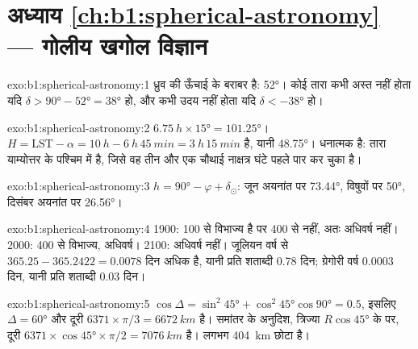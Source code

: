 \section*{अध्याय \ref{ch:b1:spherical-astronomy} --- गोलीय खगोल विज्ञान}

\begin{solution}{exo:b1:spherical-astronomy:1}
ध्रुव की ऊँचाई  के बराबर है: \ang{52}। कोई तारा कभी अस्त नहीं होता यदि
$\delta > \ang{90} - \ang{52} = \ang{38}$ हो, और कभी उदय नहीं होता यदि
$\delta < \ang{-38}$ हो।
\end{solution}

\begin{solution}{exo:b1:spherical-astronomy:2}
$\qty{6.75}{h}\times\ang{15} = \ang{101.25}$। $H = \mathrm{LST} - \alpha =
\qty{10}{h} - \qty{6}{h}\,\qty{45}{min} = \qty{3}{h}\,\qty{15}{min}$ है, यानी
\ang{48.75}।  धनात्मक है: तारा याम्योत्तर के पश्चिम में है, जिसे वह तीन और एक चौथाई
नाक्षत्र घंटे पहले पार कर चुका है।
\end{solution}

\begin{solution}{exo:b1:spherical-astronomy:3}
$h = \ang{90} - \varphi + \delta_\odot$: जून अयनांत पर \ang{73.44}, विषुवों पर \ang{50},
दिसंबर अयनांत पर \ang{26.56}।
\end{solution}

\begin{solution}{exo:b1:spherical-astronomy:4}
1900: 100 से विभाज्य है पर 400 से नहीं, अतः अधिवर्ष नहीं। 2000: 400 से विभाज्य, अधिवर्ष।
2100: अधिवर्ष नहीं। जूलियन वर्ष  से $365.25 - 365.2422 = 0.0078$ दिन अधिक है,
यानी प्रति शताब्दी \num{0.78} दिन; ग्रेगोरी वर्ष $0.0003$ दिन, यानी प्रति शताब्दी \num{0.03} दिन।
\end{solution}

\begin{solution}{exo:b1:spherical-astronomy:5}
$\cos\Delta = \sin^2\ang{45} + \cos^2\ang{45}\cos\ang{90} = 0.5$, इसलिए
$\Delta = \ang{60}$ और दूरी $6371\times\pi/3 = \qty{6672}{km}$ है। समांतर के अनुदिश, त्रिज्या
$R\cos\ang{45}$ के  पर, दूरी
$6371\times\cos\ang{45}\times\pi/2 = \qty{7076}{km}$ है।  लगभग \qty{404}{km} छोटा है।
\end{solution}

